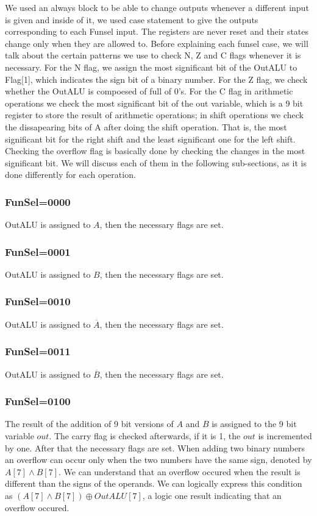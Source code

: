 \documentclass[pdftex,12pt,a4paper]{article}
\begin{document}
We used an always block to be able to change outputs whenever a different input is given and inside of it, we used case statement to
give the outputs corresponding to each Funsel input. The registers are never reset and their states change only when they are allowed
to. 
\newline
Before explaining each funsel case, we will talk about the certain patterns we use to check N, Z and C flags whenever it is necessary. 
For the N flag, we assign the most significant bit of the OutALU to Flag[1], which indicates the sign bit of a binary number. 
For the Z flag, we check whether the OutALU is compoesed of full of 0's. For the C flag in arithmetic operations we check the most 
significant bit of the out variable, which is a 9 bit register to store the result of arithmetic operations; in shift operations we 
check the dissapearing bits of A after doing the shift operation. That is, the most significant bit for the right shift and the 
least significant one for the left shift. 
Checking the overflow flag is basically done by checking the changes in the most significant bit. We will discuss each of them
in the following sub-sections, as it is done differently for each operation. 

\subsubsection{FunSel=0000}
OutALU is assigned to $A$, then the necessary flags are set.
\subsubsection{FunSel=0001}
OutALU is assigned to $B$, then the necessary flags are set.
\subsubsection{FunSel=0010}
OutALU is assigned to $\overline{A}$, then the necessary flags are set.
\subsubsection{FunSel=0011}
OutALU is assigned to $\overline{B}$, then the necessary flags are set.
\subsubsection{FunSel=0100}
The result of the addition of 9 bit versions of $A$ and $B$ is assigned to the 9 bit variable $out$. The carry flag is checked 
afterwards, if it is 1, the $out$ is incremented by one. After that the necessary flags are set.
\newline
When adding two binary numbers an overflow can occur only when the two numbers have the same sign, denoted by $A[7]\land B[7]$. 
We can understand that an overflow occured when the result is different than the signs of the operands. We can logically express this 
condition as $(A[7]\land B[7])\oplus {OutALU[7]}$, a logic one result indicating that an overflow occured.
\end{document}
